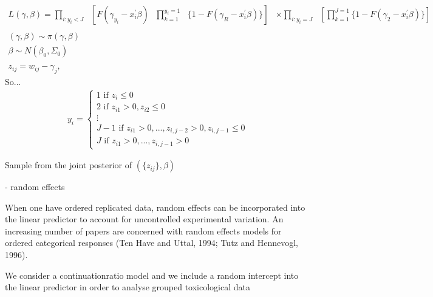 \begin{eqnarray}
	L(\gamma,\beta) = \prod_{i\colon y_{i}<J}\text{ }[ F(\gamma_{y_{i}} - x_{i}^{'}\beta)\text{ }\prod_{k=1}^{y_{i}=1}\text{ }\{1-F(\gamma_{R}-x_{i}^{'}\beta)\}] &\times \displaystyle \prod_{i\colon y_{i}=J}\text{ }[\prod_{k=1}^{J=1} \{1-F(\gamma_{2} - x_{i}^{'}\beta)\}] \nonumber \\
	\nonumber \\
	(\gamma,\beta) \sim \pi (\gamma,\beta) & \nonumber \\
	\beta \sim N(\beta_{0},\Sigma_{0}) & \nonumber \\
	\nonumber \\
	z_{ij} = w_{ij} - \gamma_{j}, & \nonumber
	\end{eqnarray}
	So...
	\begin{eqnarray}
	y_{i} =
	\begin{cases}
	1\text{ if }z_{i} \leq 0 \nonumber \\
	2\text{ if }z_{i1} > 0, z_{i2} \leq 0 \nonumber \\
	\vdots \nonumber \\
	J-1\text{ if }z_{i1} > 0,...,z_{i,j-2}>0,z_{i,j-1}\leq0 \nonumber \\
	J\text{ if }z_{i1}>0,...,z_{i,j-1}>0
\end{cases}
\end{eqnarray}

Sample from the joint posterior of $(\{z_{ij}\},\beta)$

- random effects

When one have ordered replicated data, random effects can be incorporated into the linear predictor
to account for uncontrolled experimental variation. An increasing number of papers are concerned
with random effects models for ordered categorical responses (Ten Have and Uttal, 1994; Tutz and
Hennevogl, 1996).

\citep{have:uttal:1994}

\citep{tutz:hennevogl:1996}

We consider a continuationratio model and we include a random intercept into the linear predictor in order to analyse grouped
toxicological data


%

\citep{hoff:2007}
\citep{hollenbach:etal:2018}


